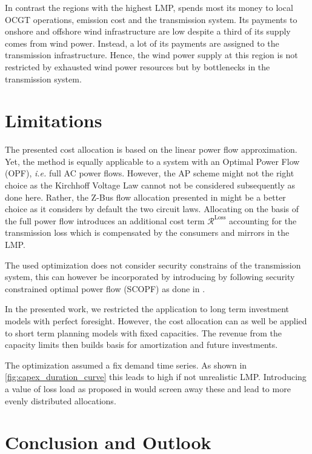 \documentclass[11pt,twocolumn]{article}
\newcommand{\ie}{\textit{i.e.} }
\newcommand{\remainingcost}{\mathcal{R}}
\begin{document}
In contrast the regions with the highest LMP, spends most its money to local OCGT operations, emission cost and the transmission system. Its payments to  onshore and offshore wind infrastructure are low despite a third of its supply comes from wind power. Instead, a lot of its payments are assigned to the transmission infrastructure. Hence, the wind power supply at this region is not restricted by exhausted wind power resources but by bottlenecks in the transmission system.  

\section{Limitations}
The presented cost allocation is based on the linear power flow approximation. Yet, the method is equally applicable to a system with an Optimal Power Flow (OPF), \ie full AC power flows. However, the AP scheme might not the right choice as the Kirchhoff Voltage Law cannot not be considered subsequently as done here. Rather, the Z-Bus flow allocation presented in \cite{conejo_z-bus_2007} might be a better choice as it considers by default the two circuit laws. Allocating on the basis of the full power flow introduces an additional cost term $\remainingcost^\text{Loss}$ accounting for the transmission loss which is compensated by the consumers and mirrors in the LMP. 

The used optimization does not consider security constrains of the transmission system, this can however be incorporated by introducing by following security constrained optimal power flow (SCOPF) as done in \cite{nikoukar_transmission_2012}. 

In the presented work, we restricted the application to long term investment models with perfect foresight. However, the cost allocation can as well be applied to short term planning models with fixed capacities. The revenue from the capacity limits then builds basis for amortization and future investments.

The optimization assumed a fix demand time series. As shown in \cref{fig:capex_duration_curve} this leads to high if not unrealistic LMP. Introducing a value of loss load as proposed in \cite{schroder_value_2015}  would screen away these and lead to more evenly distributed allocations. 


\section{Conclusion and Outlook}
\end{document}
